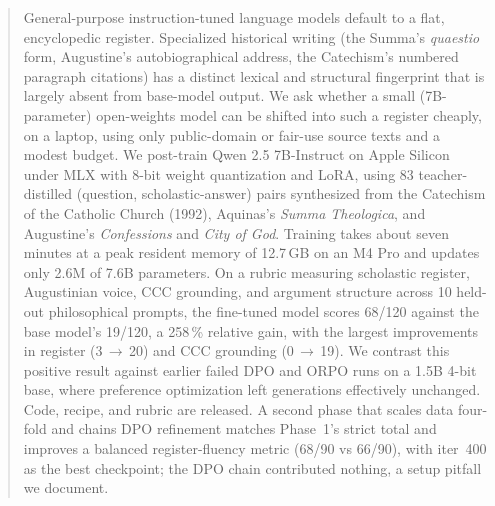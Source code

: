 \begin{abstract}
General-purpose instruction-tuned language models default to a flat,
encyclopedic register. Specialized historical writing (the Summa's
\emph{quaestio} form, Augustine's autobiographical address, the Catechism's
numbered paragraph citations) has a distinct lexical and structural
fingerprint that is largely absent from base-model output. We ask whether a
small (7B-parameter) open-weights model can be shifted into such a register
cheaply, on a laptop, using only public-domain or fair-use source texts and a
modest budget. We post-train Qwen 2.5 7B-Instruct on Apple Silicon under MLX
with 8-bit weight quantization and LoRA, using 83 teacher-distilled
(question, scholastic-answer) pairs synthesized from the Catechism of the
Catholic Church (1992), Aquinas's \emph{Summa Theologica}, and Augustine's
\emph{Confessions} and \emph{City of God}. Training takes about seven minutes
at a peak resident memory of 12.7\,GB on an M4 Pro and updates only 2.6M of
7.6B parameters. On a rubric measuring scholastic register, Augustinian
voice, CCC grounding, and argument structure across 10 held-out
philosophical prompts, the fine-tuned model scores 68/120 against the base
model's 19/120, a 258\,\% relative gain, with the largest improvements in
register (3\,$\to$\,20) and CCC grounding (0\,$\to$\,19). We contrast this
positive result against earlier failed DPO and ORPO runs on a 1.5B 4-bit
base, where preference optimization left generations effectively unchanged.
Code, recipe, and rubric are released. A second phase that scales data
four-fold and chains DPO refinement matches Phase~1's strict total and
improves a balanced register-fluency metric (68/90 vs 66/90), with iter~400
as the best checkpoint; the DPO chain contributed nothing, a setup pitfall
we document.
\end{abstract}
